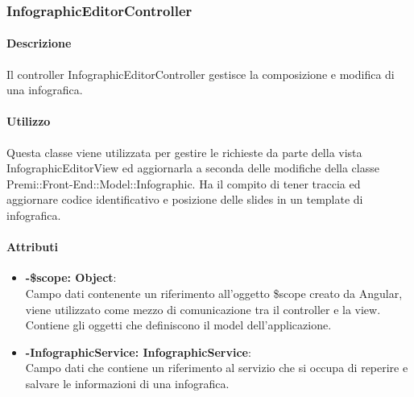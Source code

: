 \subsubsection{InfographicEditorController}
\paragraph{Descrizione}
	Il controller InfographicEditorController gestisce la composizione e modifica di una infografica.
	
	\paragraph{Utilizzo}
	Questa classe viene utilizzata per gestire le richieste da parte della vista InfographicEditorView ed aggiornarla a seconda delle modifiche della classe Premi::Front-End::Model::Infographic.
	Ha il compito di tener traccia ed aggiornare codice identificativo e posizione delle slides in un template di infografica.
	\paragraph{Attributi}
	\begin{itemize}
		\item \textbf{-\$scope: Object}:\\
			Campo dati contenente un riferimento all'oggetto \$scope creato da Angular, viene utilizzato come mezzo di comunicazione tra il controller e la view. Contiene gli oggetti che definiscono il model dell'applicazione.
		\item \textbf{-InfographicService: InfographicService}:\\
			Campo dati che contiene un riferimento al servizio che si occupa di reperire e salvare le informazioni di una infografica.
	\end{itemize}
	
